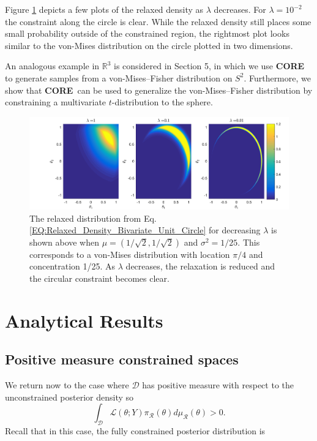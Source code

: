 \documentclass[10pt,fleqn]{article}
\newcommand{\core}{\textbf{CORE}}
\DeclareMathOperator{\1}{\mathbbm{1}}
\begin{document}
Figure \ref{FIG:Bivariate_Normal_Unit_Circle_Constraint} depicts a few plots of the relaxed density as $\lambda$ decreases.  For $\lambda=10^{-2}$ the constraint along the circle is clear. While the relaxed density still places some small probability outside of the constrained region, the rightmost plot looks similar to the von-Mises distribution on the circle plotted in two dimensions.

An analogous example in $\mathbb{R}^3$ is considered in Section 5, in which we use \core\, to generate samples from a von-Mises--Fisher distribution on $S^2$. Furthermore, we show that \core\, can be used to generalize the von-Mises--Fisher distribution by constraining a multivariate $t$-distribution to the sphere. 



\begin{figure}
\begin{center}
\includegraphics[width=1\textwidth]{Bivariate_Normal_Unit_Circle_Constraint.jpg}
\caption{The relaxed distribution from Eq. \eqref{EQ:Relaxed_Density_Bivariate_Unit_Circle} for decreasing $\lambda$ is shown above when $\mu = (1/\sqrt{2},1/\sqrt{2})$ and $\sigma^2 = 1/25.$ This corresponds to a von-Mises distribution with location $\pi/4$ and concentration 1/25. As $\lambda$ decreases, the relaxation is reduced and the circular constraint becomes clear.}
\label{FIG:Bivariate_Normal_Unit_Circle_Constraint}
\end{center}
\end{figure}

\section{Analytical Results}
\subsection{Positive measure constrained spaces}
\label{SEC:Positive_measure_theory}

We return now to the case where $\mathcal{D}$ has positive measure with respect to the unconstrained posterior density so $$\int_\mathcal{D} \mathcal{L}(\theta; Y) \pi_\mathcal{R}(\theta)d\mu_\mathcal{R}(\theta) >0.$$ Recall that in this case, the fully constrained posterior distribution is
\end{document}
